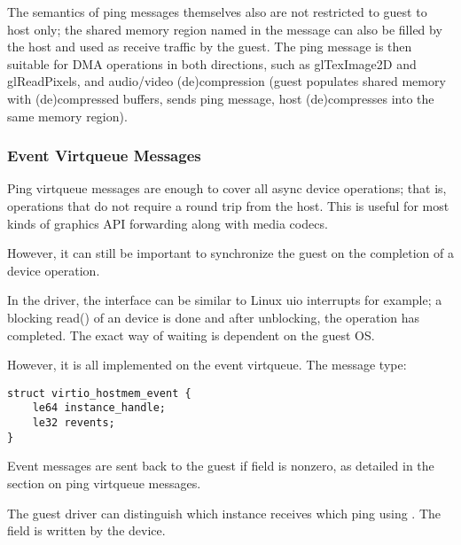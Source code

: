 The semantics of ping messages themselves also are not restricted to guest to host only;
the shared memory region named in the message can also be filled by the host
and used as receive traffic by the guest.
The ping message is then suitable for DMA operations in both directions,
such as glTexImage2D and glReadPixels,
and audio/video (de)compression (guest populates shared memory with (de)compressed buffers,
sends ping message, host (de)compresses into the same memory region).

\subsubsection{Event Virtqueue Messages}\label{sec:Device Types / Host Memory Device / Device Operation / Event Virtqueue Messages}

Ping virtqueue messages are enough to cover all async device operations;
that is, operations that do not require a round trip from the host.
This is useful for most kinds of graphics API forwarding along
with media codecs.

However, it can still be important to synchronize the guest on the completion
of a device operation.

In the driver, the interface can be similar to Linux uio interrupts for example;
a blocking read() of an device is done and after unblocking,
the operation has completed.
The exact way of waiting is dependent on the guest OS.

However, it is all implemented on the event virtqueue. The message type:

\begin{lstlisting}
struct virtio_hostmem_event {
    le64 instance_handle;
    le32 revents;
}
\end{lstlisting}

Event messages are sent back to the guest if  field is nonzero,
as detailed in the section on ping virtqueue messages.

The guest driver can distinguish which instance receives which ping using
.
The field  is written by the device.

